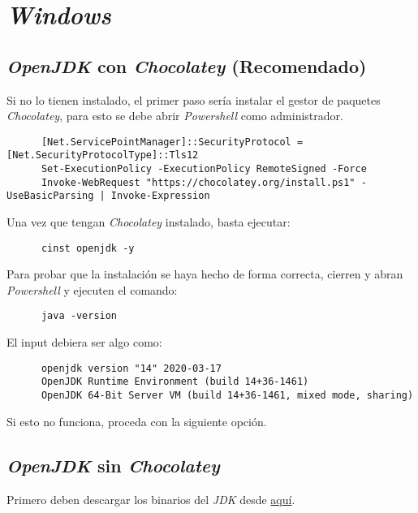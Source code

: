 \section{\textit{Windows}}
  \subsection{\textit{OpenJDK} con \textit{Chocolatey} (Recomendado)}
    Si no lo tienen instalado, el primer paso sería instalar el gestor de paquetes 
    \textit{Chocolatey}, para esto se debe abrir \textit{Powershell} como 
    administrador.

    \begin{verbatim}
      [Net.ServicePointManager]::SecurityProtocol = [Net.SecurityProtocolType]::Tls12
      Set-ExecutionPolicy -ExecutionPolicy RemoteSigned -Force
      Invoke-WebRequest "https://chocolatey.org/install.ps1" -UseBasicParsing | Invoke-Expression
    \end{verbatim}

    Una vez que tengan \textit{Chocolatey} instalado, basta ejecutar:

    \begin{verbatim}
      cinst openjdk -y
    \end{verbatim}

    Para probar que la instalación se haya hecho de forma correcta, cierren y abran 
    \textit{Powershell} y ejecuten el comando:

    \begin{verbatim}
      java -version
    \end{verbatim}

    El input debiera ser algo como:

    \begin{verbatim}
      openjdk version "14" 2020-03-17
      OpenJDK Runtime Environment (build 14+36-1461)
      OpenJDK 64-Bit Server VM (build 14+36-1461, mixed mode, sharing)
    \end{verbatim}

    Si esto no funciona, proceda con la siguiente opción.

  \subsection{\textit{OpenJDK} sin \textit{Chocolatey}}
    Primero deben descargar los binarios del \textit{JDK} desde 
    \href{
      https://download.java.net/java/GA/jdk14/076bab302c7b4508975440c56f6cc26a/36/GPL/openjdk-14_windows-x64_bin.zip
      }{aquí}.
    
